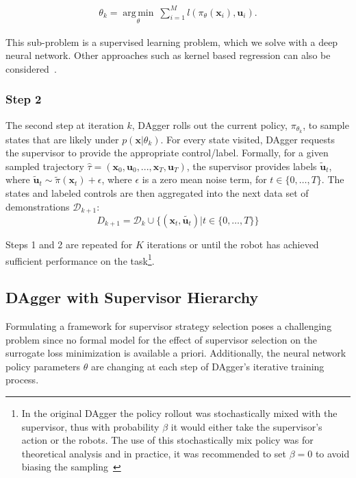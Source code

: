 \documentclass[10pt, conference]{ieeeconf}      %
\DeclareMathOperator*{\argmin}{arg\,min}
\newcommand{\bu}{\mathbf{u}}
\newcommand{\bx}{\mathbf{x}}
\begin{document}
 \vspace{-1ex}
\begin{align}\label{eq:super_objj}
\theta_{k} = \underset{\theta}{\argmin} \: \sum_{i=1}^{M} l(\pi_{\theta}(\bx_i),\bu_i).
\end{align}

This sub-problem is a supervised learning problem, which we solve with a deep neural network. Other approaches such as
kernel based regression can also be considered~\cite{scholkopf2002learning}. 
 

 \subsubsection{Step 2}
The second step at iteration $k$, DAgger rolls out the current policy, $\pi_{\theta_{k}}$, to sample states that are likely under $p(\bx|\theta_{k})$.  For every state visited, DAgger requests the supervisor to provide the appropriate control/label. Formally, for a given sampled trajectory  $\hat{\tau} = (\bx_0,\bu_0,...,\bx_T,\bu_T )$, the supervisor provides labels $\tilde{\bu}_t$, where $\tilde{\bu}_t \sim \tilde{\pi}(\bx_t) + \epsilon$, where $\epsilon$ is a  zero mean noise term, for $t\in \{0, \ldots, T\}$.
The states and labeled controls are then aggregated into the next data set of demonstrations $\mathcal{D}_{k+1}$:
$$D_{k+1}=\mathcal{D}_k \cup \{(\bx_t,\tilde{\bu_t})|t\in\{0,\ldots,T\}\} $$

Steps 1 and 2 are repeated for $K$ iterations or until the robot has achieved sufficient performance on the
task\footnote{In the original DAgger the policy rollout was stochastically mixed with the supervisor, thus with
    probability $\beta$ it would either take the supervisor's action or the robots. The use of this stochastically mix
    policy was for theoretical analysis and in practice, it was recommended to set $\beta = 0$ to avoid biasing the
sampling~\cite{NIPS2014_5421,ross2010reduction}}.


\subsection{DAgger with Supervisor Hierarchy}
Formulating a framework for supervisor strategy selection poses a challenging problem since no formal model
for the effect of supervisor selection on the surrogate loss minimization is available a priori. Additionally, the
neural network policy parameters $\theta$ are  changing at each step of DAgger's iterative training process.
\end{document}
